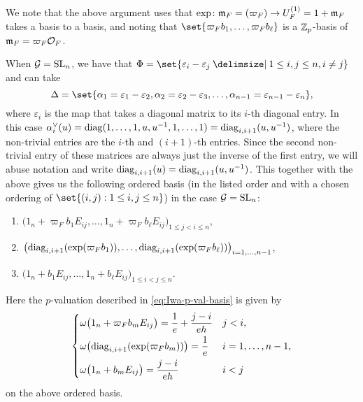 We note that the above argument uses that $\exp \colon \mathfrak{m}_{F} = (\varpi_{F}) \to U_{F}^{(1)} = 1 + \mathfrak{m}_{F}$ takes a basis to a basis, and noting that $\set{ \varpi_{F}b_{1}, \dotsc, \varpi_{F}b_{\ell} }$ is a $\mathbb{Z}_{p}$-basis of $\mathfrak{m}_{F} = \varpi_{F}\mathcal{O}_{F}$. %

When $\mathcal{G} = \operatorname{SL}_{n}$, we have that $\Phi = \set{ \varepsilon_{i}-\varepsilon_{j} \given 1 \leq i,j \leq n, i\neq j }$ and can take
\begin{equation*}
  \Delta = \set{\alpha_{1}=\varepsilon_{1}-\varepsilon_{2}, \alpha_{2}=\varepsilon_{2}-\varepsilon_{3}, \dotsc, \alpha_{n-1}=\varepsilon_{n-1}-\varepsilon_{n}},
\end{equation*}
where $\varepsilon_{i}$ is the map that takes a diagonal matrix to its $i$-th diagonal entry. In this case $\alpha_{i}^{\vee}(u) = \operatorname{diag}(1,\dotsc,1,u,u^{-1},1,\dotsc,1) = \operatorname{diag}_{i,i+1}(u,u^{-1})$, where the non-trivial entries are the $i$-th and $(i+1)$-th entries. Since the second non-trivial entry of these matrices are always just the inverse of the first entry, we will abuse notation and write $\operatorname{diag}_{i,i+1}(u) = \operatorname{diag}_{i,i+1}(u,u^{-1})$. This together with the above gives us the following ordered basis (in the listed order and with a chosen ordering of $\set{ (i,j) : 1 \leq i,j \leq n }$) in the case $\mathcal{G} = \operatorname{SL}_{n}$:
\begin{enumerate}[$\bullet$]
  \item $\bigl( 1_{n}+\varpi_{F}b_{1}E_{ij}, \dotsc, 1_{n}+\varpi_{F}b_{\ell}E_{ij} \bigr)_{1 \leq j < i \leq n}$,
  \item $\bigl( \operatorname{diag}_{i,i+1}(\exp(\varpi_{F}b_{1})), \dotsc, \operatorname{diag}_{i,i+1}(\exp(\varpi_{F}b_{\ell})) \bigr)_{i=1,\dotsc,n-1}$,
  \item $\bigl( 1_{n}+b_{1}E_{ij}, \dotsc, 1_{n}+b_{\ell}E_{ij} \bigr)_{1 \leq i < j \leq n}$.
\end{enumerate}
Here the $p$-valuation described in \eqref{eq:Iwa-p-val-basis} is given by
\begin{equation}\label{eq:Iwa-p-val-basis-SLn}
  \begin{dcases}
    \omega\bigl( 1_{n} + \varpi_{F}b_{m}E_{ij} \bigr) = \frac{1}{e} + \frac{j-i}{eh} & j < i, \\
    \omega\bigl( \operatorname{diag}_{i,i+1}(\exp(\varpi_{F}b_{m})) \bigr) = \frac{1}{e} & i = 1,\dotsc,n-1, \\
    \omega\bigl( 1_{n}+b_{m}E_{ij} \bigr) = \frac{j-i}{eh} & i < j
  \end{dcases}
\end{equation}
on the above ordered basis.

